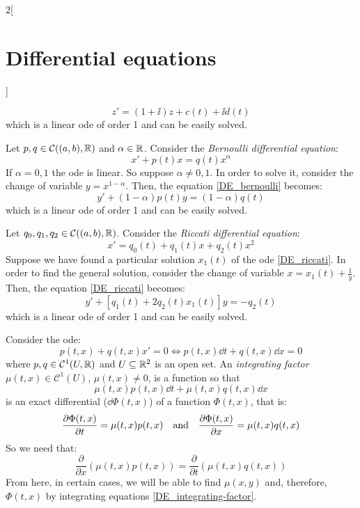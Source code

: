 \documentclass[../../../main.tex]{subfiles}
\begin{document}
\begin{multicols}{2}[\section{Differential equations}]
\begin{method}
    $$z'=(1+\ii)z+c(t)+\ii d(t)$$ which is a linear ode of order 1 and can be easily solved.
  \end{method}
  \begin{method}
    Let $p,q\in\mathcal{C}((a,b),\mathbb{R})$ and $\alpha\in\mathbb{R}$. Consider the \textit{Bernoulli differential equation}:
    \begin{equation}\label{DE_bernoulli}
      x'+p(t)x=q(t)x^\alpha
    \end{equation}
    If $\alpha=0,1$ the ode is linear. So suppose $\alpha\ne 0,1$. In order to solve it, consider the change of variable $y=x^{1-\alpha}$. Then, the equation \eqref{DE_bernoulli} becomes:
    $$y'+(1-\alpha)p(t)y=(1-\alpha)q(t)$$  which is a linear ode of order 1 and can be easily solved.
  \end{method}
  \begin{method}
    Let $q_0,q_1,q_2\in\mathcal{C}((a,b),\mathbb{R})$. Consider the \textit{Riccati differential equation}:
    \begin{equation}\label{DE_riccati}
      x'=q_0(t)+q_1(t)x+q_2(t)x^2
    \end{equation}
    Suppose we have found a particular solution $x_1(t)$ of the ode \eqref{DE_riccati}. In order to find the general solution, consider the change of variable $x=x_1(t)+\frac{1}{y}$. Then, the equation \eqref{DE_riccati} becomes:
    $$y'+[q_1(t)+2q_2(t)x_1(t)]y=-q_2(t)$$ which is a linear ode of order 1 and can be easily solved.
  \end{method}
  \begin{method}
    Consider the ode: $$p(t,x)+q(t,x)x'=0\iff p(t,x)\dd t+q(t,x)\dd x=0$$ where $p,q\in\mathcal{C}^1(U,\mathbb{R})$ and $U\subseteq\mathbb{R}^2$ is an open set.
    An \textit{integrating factor} $\mu(t,x)\in\mathcal{C}^1(U)$, $\mu(t,x)\ne 0$, is a function so that $$\mu(t,x)p(t,x)\dd t+\mu(t,x)q(t,x)\dd x$$ is an exact differential ($\dd \Phi(t,x)$) of a function $\Phi(t,x)$, that is:
    \begin{equation}\label{DE_integrating-factor}
      \pdv{\Phi(t,x)}{t}=\mu(t,x)p(t,x)\quad\text{and}\quad\pdv{\Phi(t,x)}{x}=\mu(t,x)q(t,x)
    \end{equation}
    So we need that: $$\frac{\partial}{\partial x}\left(\mu(t,x)p(t,x)\right)=\frac{\partial}{\partial t}\left(\mu(t,x)q(t,x)\right)$$
    From here, in certain cases, we will be able to find $\mu(x,y)$ and, therefore, $\Phi(t,x)$ by integrating equations \eqref{DE_integrating-factor}.
  \end{method}

\end{multicols}
\end{document}
